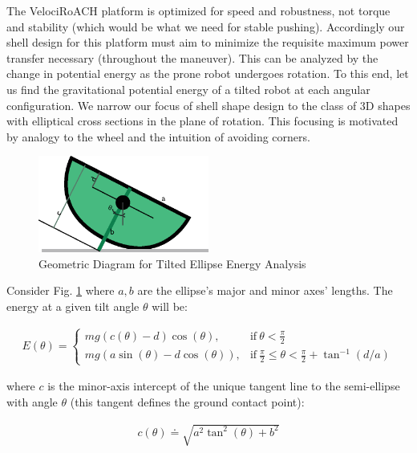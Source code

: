 \documentclass[letterpaper]{report}
\begin{document}
The VelociRoACH platform is optimized for speed and robustness, not torque and stability (which would be what we need for stable pushing).
Accordingly our shell design for this platform must aim to minimize the requisite maximum power transfer necessary (throughout the maneuver).
This can be analyzed by the change in potential energy as the prone robot undergoes rotation.
To this end, let us find the gravitational potential energy of a tilted robot at each angular configuration.
We narrow our focus of shell shape design to the class of 3D shapes with elliptical cross sections in the plane of rotation.
This focusing is motivated by analogy to the wheel and the intuition of avoiding corners.

\begin{figure}[ht]
\centering
\includegraphics[width=0.5\textwidth]{QS_EnergyAnalysis.eps}
\caption{\label{f:QS_energyGeometry}Geometric Diagram for Tilted Ellipse Energy Analysis}
\end{figure}

Consider Fig. \ref{f:QS_energyGeometry} where $a,b$ are the ellipse's major and minor axes' lengths.
The energy at a given tilt angle $\theta$ will be:

\begin{align}
  E(\theta) =
    \begin{cases}
      mg (c(\theta)-d) \cos(\theta), & \text{if}\ \theta < \frac{\pi}{2} \\
      mg (a \sin(\theta) - d \cos(\theta) ), & \text{if}\ \frac{\pi}{2} \leq \theta < \frac{\pi}{2} + \tan^{-1}(d/a)
    \end{cases}
  \label{eq:QSEnergy}
\end{align}

where $c$ is the minor-axis intercept of the unique tangent line to the semi-ellipse with angle $\theta$ (this tangent defines the ground contact point):

\begin{align}
  c(\theta) \doteq \sqrt{a^2 \tan^2(\theta) + b^2}
\end{align}
\end{document}
